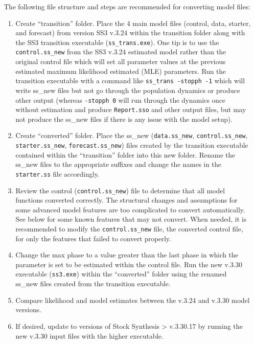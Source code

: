 The following file structure and steps are recommended for converting model files:
\begin{enumerate}
	\item Create ``transition'' folder. Place the 4 main model files (control, data, starter, and forecast) from version SS3 v.3.24 within the transition folder along with the SS3 transition executable (\texttt{ss\_trans.exe}). One tip is to use the \texttt{control.ss\_new} from the SS3 v.3.24 estimated model rather than the original control file which will set all parameter values at the previous estimated maximum likelihood estimated (MLE) parameters. Run the transition executable with a command like \texttt{ss\_trans -stopph -1} which will write ss\_new files but not go through the population dynamics or produce other output (whereas \texttt{-stopph 0} will run through the dynamics once without estimation and produce \texttt{Report.sso} and other output files, but may not produce the ss\_new files if there is any issue with the model setup).
	
	\item Create ``converted'' folder.  Place the ss\_new (\texttt{data.ss\_new}, \texttt{control.ss\_new}, \texttt{starter.ss\_new}, \texttt{forecast.ss\_new}) files created by the transition executable contained within the ``transition'' folder into this new folder. Rename the ss\_new files to the appropriate suffixes and change the names in the \texttt{starter.ss} file accordingly.
	
	\item Review the control (\texttt{control.ss\_new}) file to determine that all model functions converted correctly. The structural changes and assumptions for some advanced model features are too complicated to convert automatically. See below for some known features that may not convert. When needed, it is recommended to modify the \texttt{control.ss\_new} file, the converted control file, for only the features that failed to convert properly.
	
	\item Change the max phase to a value greater than the last phase in which the parameter is set to be estimated within the control file. Run the new v.3.30 executable (\texttt{ss3.exe}) within the ``converted'' folder using the renamed ss\_new files created from the transition executable.
	
	\item Compare likelihood and model estimates between the v.3.24 and v.3.30 model versions.
	
	\item If desired, update to versions of Stock Synthesis > v.3.30.17 by running the new v.3.30 input files with the higher executable.
\end{enumerate}

